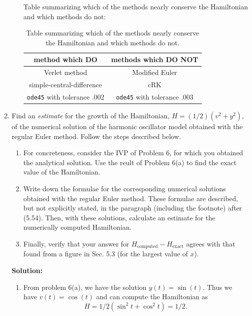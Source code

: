 \documentclass[11pt]{article}
\begin{document}
\begin{enumerate}
\begin{enumerate}
Table summarizing which of the methods nearly conserve the Hamiltonian and which methods do not:


\begin{table}
\centering
\begin{tabular}[h!]{cc}
\hline
method which DO & methods which DO NOT\\
\hline
\hline
Verlet method & Modified Euler\\
simple-central-difference & cRK\\
\verb|ode45| with tolerance .002 & \verb|ode45| with tolerance .003 \\
\hline

\end{tabular}

\caption{Table summarizing which of the methods nearly conserve the Hamiltonian and which methods do not.}
\end{table}

\end{enumerate}

\clearpage
\pagebreak
\item Find an {\em estimate} for the growth of the Hamiltonian, $H = (1/2) (v^2 + y^2)$, of the numerical solution of the harmonic oscillator model obtained with the regular Euler method.
Follow the steps described below.

\begin{enumerate}
\item For concreteness, consider the IVP of Problem 6, for which you obtained the analytical solution.
Use the reult of Problem 6(a) to find the exact value of the Hamiltonian.

\item Write down the formulae for the corresponding numerical solutions obtained with the regular Euler method.
These formulae are described, but not explicitly stated, in the paragraph (including the footnote) after (5.54).
Then, with these solutions, calculate an estimate for the numerically computed Hamiltonian.

\item Finally, verify that your answer for $H_\text{computed} - H_\text{exact}$ agrees with that found from a figure in Sec. 5.3 (for the largest value of $x$).

\end{enumerate}

\bigskip
\textbf{Solution:}

\begin{enumerate}
\item From problem 6(a), we have the solution $y(t) = \sin (t)$.
Thus we have $v(t) = \cos (t)$ and can compute the Hamiltonian as
\[ H = 1/2 (\sin ^2 t + \cos^2 t) = 1/2 .\]


\end{enumerate}
\end{enumerate}
\end{document}
